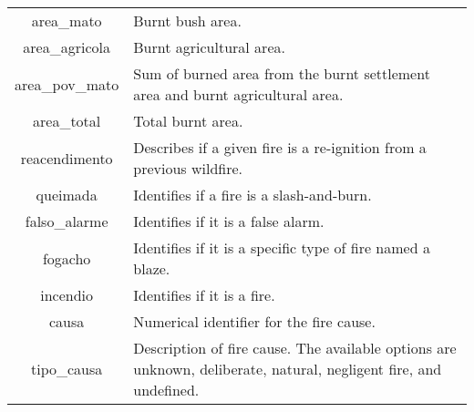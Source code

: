 \begin{table}[H]
\begin{tabular}{cp{7.5cm}}
		area\_mato & Burnt bush area.  \\
		area\_agricola & Burnt agricultural area. \\
		area\_pov\_mato & Sum of burned area from the burnt settlement area and burnt agricultural area.\\
		area\_total & Total burnt area. \\
		reacendimento & Describes if a given fire is a re-ignition from a previous wildfire. \\
		queimada & Identifies if a fire is a slash-and-burn. \\
		falso\_alarme & Identifies if it is a false alarm. \\
		fogacho & Identifies if it is a specific type of fire named a blaze. \\
		incendio & Identifies if it is a fire. \\
		causa & Numerical identifier for the fire cause. \\
		tipo\_causa & Description of fire cause. The available options are unknown, deliberate, natural, negligent fire, and undefined. \\
		\hline
	\end{tabular}
\end{table}


